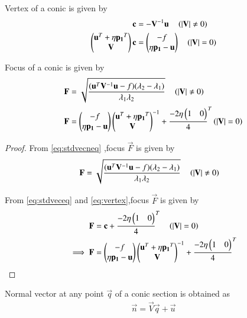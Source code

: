 \documentclass[journal,12pt,twocolumn]{IEEEtran}
\begin{document}
\begin{lemma}
Vertex of a conic is given by 
\begin{align}
\mathbf{c} &= -\mathbf{V}^{-1}\mathbf{u} \quad \left(\left\vert\mathbf{V}\right\vert \neq 0\right) \label{eq:vertexneq}
\\
\begin{pmatrix}\mathbf{u}^T + \eta\mathbf{p_1}^T \\ \mathbf{V}\end{pmatrix}\mathbf{c} &= \begin{pmatrix}-f \\ \eta\mathbf{p_1} - \mathbf{u}\end{pmatrix} \quad \left(\left\vert\mathbf{V}\right\vert = 0\right) \label{eq:vertex}
\end{align}
\end{lemma}

\begin{lemma}
Focus of a conic is given by 
\begin{align}
\mathbf{F} &= \sqrt{\frac{(\mathbf{u}^T\mathbf{V}^{-1}\mathbf{u}-f)(\lambda_2-\lambda_1)}{\lambda_1\lambda_2}} \quad \left(\left\vert\mathbf{V}\right\vert \neq 0\right) \label{eq:focusneq}
\\
\mathbf{F} &= \begin{pmatrix}-f \\ \eta\mathbf{p_1} - \mathbf{u}\end{pmatrix}{\ensuremath{\begin{pmatrix}\mathbf{u}^T + \eta\mathbf{p_1}^T \\ \mathbf{V}\end{pmatrix}}}^{-1}+{\frac{-2\eta\begin{pmatrix}1 & 0\end{pmatrix}}{4}}^{T} \left(\left\vert\mathbf{V}\right\vert = 0\right) \label{eq:focus}
\end{align}
\end{lemma}

\begin{proof}
From \eqref{eq:stdvecneq} ,focus $\vec{F}$ is given by
\begin{align}
\mathbf{F} &= \sqrt{\frac{(\mathbf{u}^T\mathbf{V}^{-1}\mathbf{u}-f)(\lambda_2-\lambda_1)}{\lambda_1\lambda_2}} \quad \left(\left\vert\mathbf{V}\right\vert \neq 0\right)
\end{align}

From \eqref{eq:stdveceq} and \eqref{eq:vertex},focus $\vec{F}$ is given by
\begin{align}
\mathbf{F} &= \mathbf{c} + {\frac{-2\eta\begin{pmatrix}1 & 0\end{pmatrix}}{4}}^{T} \quad \left(\left\vert\mathbf{V}\right\vert = 0\right)\\
\implies \mathbf{F} &= \begin{pmatrix}-f \\ \eta\mathbf{p_1} - \mathbf{u}\end{pmatrix}{\ensuremath{\begin{pmatrix}\mathbf{u}^T + \eta\mathbf{p_1}^T \\ \mathbf{V}\end{pmatrix}}}^{-1} + {\frac{-2\eta\begin{pmatrix}1 & 0\end{pmatrix}}{4}}^{T}
\end{align}
\end{proof}

\begin{lemma}
Normal vector at any point $\vec{q}$ of a conic section is obtained as 
\begin{align}
    \vec{n}=\vec{V}\vec{q} + \vec{u}
\end{align}
\label{eq:norm}
\end{lemma}
\end{document}
